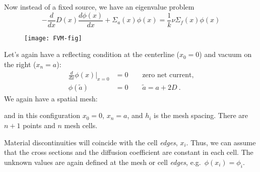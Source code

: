 \documentclass[12pt]{article}
\begin{document}
Now instead of a fixed source, we have an eigenvalue problem
\[-\frac{d}{dx}D(x)\frac{d \phi(x)}{dx} + \Sigma_a(x) \phi(x) = \frac{1}{k}\nu \Sigma_f(x) \phi(x) \]
%
\begin{figure}[h!]
\begin{center}
\texttt{[image: FVM-fig]}
\end{center}
\end{figure}
%
Let's again have a reflecting condition at the centerline ($x_0 = 0$) and vacuum on the right ($x_n = a$):
\begin{align}
\frac{d}{dx}\phi(x) \big|_{x=0} &= 0 \qquad \text{zero net current,} \nonumber\\
\phi(\tilde{a}) &= 0 \qquad \tilde{a} = a + 2D\:. \nonumber
\end{align}
%
We again have a spatial mesh:
%
\begin{center}
\end{center}
%
and in this configuration $x_0 = 0$, $x_n = a$, and $h_i$ is the mesh spacing. There are $n+1$ points and $n$ mesh cells.

Material discontinuities will coincide with the cell \textit{edges}, $x_i$. Thus, we can assume that the cross sections and the diffusion coefficient are constant in each cell.
%
%
The unknown values are again defined at the mesh or cell \textit{edges}, e.g.\ $\phi(x_i) = \phi_i$.
\end{document}
